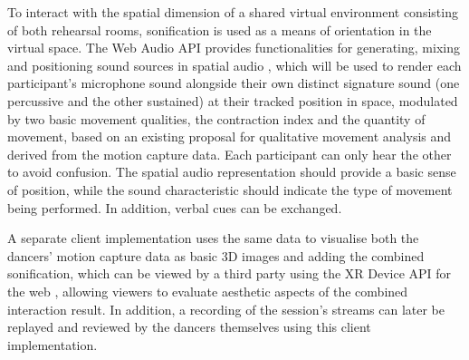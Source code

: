 To interact with the spatial dimension of a shared virtual environment consisting of both rehearsal rooms, sonification is used as a means of orientation in the virtual space. The Web Audio \ac{API} provides functionalities for generating, mixing and positioning sound sources in spatial audio \parencite{webAudioSpec}, which will be used to render each participant's microphone sound alongside their own distinct signature sound (one percussive and the other sustained) at their tracked position in space, modulated by two basic movement qualities, the contraction index and the quantity of movement, based on an existing proposal for qualitative movement analysis \parencite{movementQualities} and derived from the motion capture data. Each participant can only hear the other to avoid confusion. The spatial audio representation should provide a basic sense of position, while the sound characteristic should indicate the type of movement being performed. In addition, verbal cues can be exchanged.

A separate client implementation uses the same data to visualise both the dancers' motion capture data as basic \ac{3D} images and adding the combined sonification, which can be viewed by a third party using the \ac{XR} Device \ac{API} for the web \parencite{webXrSpec}, allowing viewers to evaluate aesthetic aspects of the combined interaction result. In addition, a recording of the session’s streams can later be replayed and reviewed by the dancers themselves using this client implementation.
